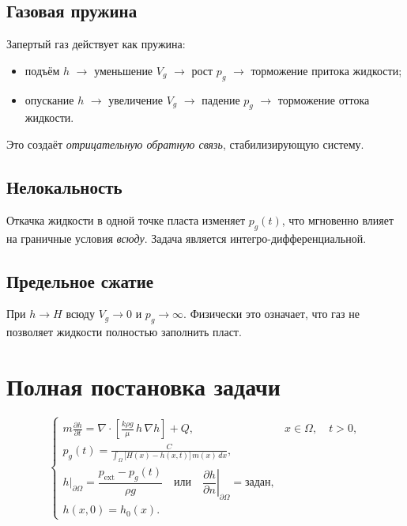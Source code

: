 \documentclass[12pt,a4paper]{article}
\begin{document}
\subsection{Газовая пружина}

Запертый газ действует как пружина:
\begin{itemize}[nosep]
  \item подъём $h$ $\to$ уменьшение $V_g$ $\to$ рост $p_g$ $\to$ торможение притока жидкости;
  \item опускание $h$ $\to$ увеличение $V_g$ $\to$ падение $p_g$ $\to$ торможение оттока жидкости.
\end{itemize}
Это создаёт \emph{отрицательную обратную связь}, стабилизирующую систему.

\subsection{Нелокальность}

Откачка жидкости в одной точке пласта изменяет $p_g(t)$, что мгновенно влияет на граничные условия \emph{всюду}. Задача является интегро-дифференциальной.

\subsection{Предельное сжатие}

При $h \to H$ всюду $V_g \to 0$ и $p_g \to \infty$. Физически это означает, что газ не позволяет жидкости полностью заполнить пласт.

\section{Полная постановка задачи}

\begin{equation}\label{eq:full}
  \begin{cases}
    \displaystyle m \frac{\partial h}{\partial t}
    = \nabla \cdot \left[\frac{k \rho g}{\mu}\, h\, \nabla h\right] + Q,
    & x \in \Omega, \quad t > 0, \\[12pt]
    \displaystyle p_g(t) = \frac{C}{\displaystyle\int_\Omega \bigl[H(x) - h(x,t)\bigr]\, m(x)\, dx},
    \\[12pt]
    h\big|_{\partial\Omega} = \dfrac{p_{\mathrm{ext}} - p_g(t)}{\rho g}
    \quad \text{или} \quad
    \left.\dfrac{\partial h}{\partial n}\right|_{\partial\Omega} = \text{задан},
    \\[12pt]
    h(x, 0) = h_0(x).
  \end{cases}
\end{equation}
\end{document}
